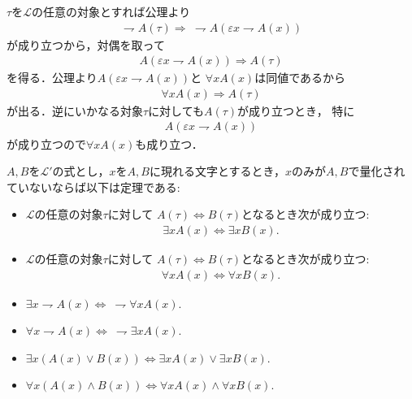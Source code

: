 	\begin{prf}
		$\tau$を$\mathcal{L}$の任意の対象とすれば公理より
		\begin{align}
			\rightharpoondown A(\tau) \Longrightarrow\ \rightharpoondown A
			\left( \varepsilon x \rightharpoondown A(x) \right)
		\end{align}
		が成り立つから，対偶を取って
		\begin{align}
			A \left( \varepsilon x \rightharpoondown A(x) \right)
			\Longrightarrow A(\tau)
		\end{align}
		を得る．公理より$A \left( \varepsilon x \rightharpoondown A(x) \right)$と
		$\forall x A(x)$は同値であるから
		\begin{align}
			\forall x A(x) \Longrightarrow A(\tau)
		\end{align}
		が出る．逆にいかなる対象$\tau$に対しても$A(\tau)$が成り立つとき，
		特に
		\begin{align}
			A \left( \varepsilon x \rightharpoondown A(x) \right)
		\end{align}
		が成り立つので$\forall x A(x)$も成り立つ．
		\QED
	\end{prf}
	
	\begin{screen}
		\begin{metathm}
			$A,B$を$\mathcal{L}'$の式とし，$x$を$A,B$に現れる文字とするとき，$x$のみが$A,B$で量化されていないならば以下は定理である:
			\begin{itemize}
				\item $\mathcal{L}$の任意の対象$\tau$に対して
					$A(\tau) \Longleftrightarrow B(\tau)$となるとき次が成り立つ:
					\begin{align}
						\exists x A(x) \Longleftrightarrow \exists x B(x).
					\end{align}
				
				\item $\mathcal{L}$の任意の対象$\tau$に対して
					$A(\tau) \Longleftrightarrow B(\tau)$となるとき次が成り立つ:
					\begin{align}
						\forall x A(x) \Longleftrightarrow \forall x B(x).
					\end{align}
					
				\item $\exists x \rightharpoondown A(x) \Longleftrightarrow\ \rightharpoondown \forall x A(x)$.
				
				\item $\forall x \rightharpoondown A(x) \Longleftrightarrow\ \rightharpoondown \exists x A(x)$.
				
				\item $\exists x ( A(x) \vee B(x) ) \Longleftrightarrow \exists x A(x) \vee \exists x B(x)$.
				
				\item $\forall x ( A(x) \wedge B(x) ) \Longleftrightarrow \forall x A(x) \wedge \forall x B(x)$.
			\end{itemize}
		\end{metathm}
	\end{screen}
	
